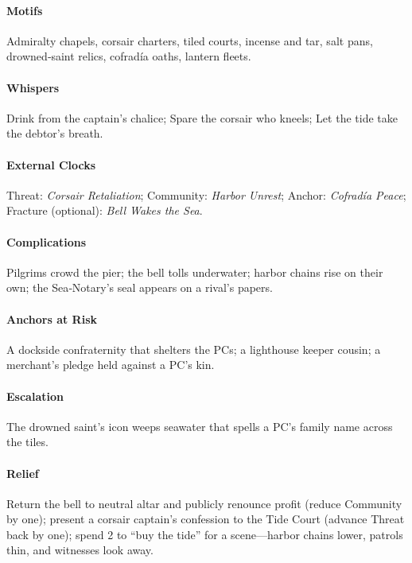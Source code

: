 \paragraph{Motifs} Admiralty chapels, corsair charters, tiled courts, incense and tar, salt pans, drowned‑saint relics, cofradía oaths, lantern fleets.
\paragraph{Whispers} Drink from the captain’s chalice; Spare the corsair who kneels; Let the tide take the debtor’s breath.
\paragraph{External Clocks} Threat: \emph{Corsair Retaliation}; Community: \emph{Harbor Unrest}; Anchor: \emph{Cofradía Peace}; Fracture (optional): \emph{Bell Wakes the Sea}.
\paragraph{Complications} Pilgrims crowd the pier; the bell tolls underwater; harbor chains rise on their own; the Sea‑Notary’s seal appears on a rival’s papers.
\paragraph{Anchors at Risk} A dockside confraternity that shelters the PCs; a lighthouse keeper cousin; a merchant’s pledge held against a PC’s kin.
\paragraph{Escalation} The drowned saint’s icon weeps seawater that spells a PC’s family name across the tiles.
\paragraph{Relief} Return the bell to neutral altar and publicly renounce profit (reduce Community by one); present a corsair captain’s confession to the Tide Court (advance Threat back by one); spend 2 \Boons{} to “buy the tide” for a scene—harbor chains lower, patrols thin, and witnesses look away.
